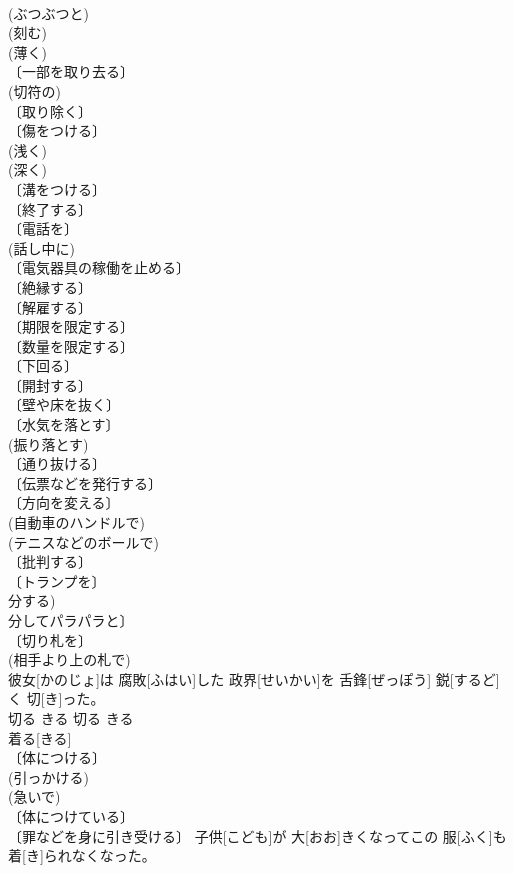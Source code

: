 \documentclass[8pt]{extreport}
\begin{document}
\begin{CJK}{UTF8}{min}
\\	(ぶつぶつと) 
\\	(刻む) 
\\	(薄く) 
\\	〔一部を取り去る〕 
\\	(切符の) 
\\	〔取り除く〕 
\\	〔傷をつける〕 
\\	(浅く) 
\\	(深く) 
\\	〔溝をつける〕 
\\	〔終了する〕 
\\	〔電話を〕 
\\	(話し中に) 
\\	〔電気器具の稼働を止める〕 
\\	〔絶縁する〕 
\\	〔解雇する〕 
\\	〔期限を限定する〕 
\\	〔数量を限定する〕 
\\	〔下回る〕 
\\	〔開封する〕 
\\	〔壁や床を抜く〕 
\\	〔水気を落とす〕 
\\	(振り落とす) 
\\	〔通り抜ける〕 
\\	〔伝票などを発行する〕 
\\	〔方向を変える〕 
\\	(自動車のハンドルで) 
\\	(テニスなどのボールで) 
\\	〔批判する〕 
\\	〔トランプを〕 
\\	分する) 
\\	分してパラパラと〕 
\\	〔切り札を〕 
\\	(相手より上の札で) 
\\	彼女[かのじょ]は 腐敗[ふはい]した 政界[せいかい]を 舌鋒[ぜっぽう] 鋭[するど]く 切[き]った。	
\\	切る	きる	切る	きる	
\\	着る[きる]	
\\	〔体につける〕 
\\	(引っかける) 
\\	(急いで) 
\\	〔体につけている〕 
\\	〔罪などを身に引き受ける〕	子供[こども]が 大[おお]きくなってこの 服[ふく]も 着[き]られなくなった。	

\end{CJK}
\end{document}
